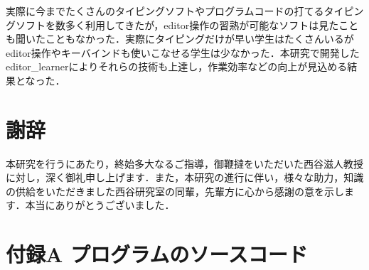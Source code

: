 \documentclass[11pt,dvipdfmx]{jsarticle}
\begin{document}
    実際に今までたくさんのタイピングソフトやプログラムコードの打てるタイピングソフトを数多く利用してきたが，editor操作の習熟が可能なソフトは見たことも聞いたこともなかった．実際にタイピングだけが早い学生はたくさんいるがeditor操作やキーバインドも使いこなせる学生は少なかった．本研究で開発したeditor\_learnerによりそれらの技術も上達し，作業効率などの向上が見込める結果となった．

    \section{謝辞}\label{ux8b1dux8f9e}

    本研究を行うにあたり，終始多大なるご指導，御鞭撻をいただいた西谷滋人教授に対し，深く御礼申し上げます．また，本研究の進行に伴い，様々な助力，知識の供給をいただきました西谷研究室の同輩，先輩方に心から感謝の意を示します．本当にありがとうございました．

    \section{付録A
プログラムのソースコード}\label{ux4ed8ux9332a-ux30d7ux30edux30b0ux30e9ux30e0ux306eux30bdux30fcux30b9ux30b3ux30fcux30c9}
\end{document}

